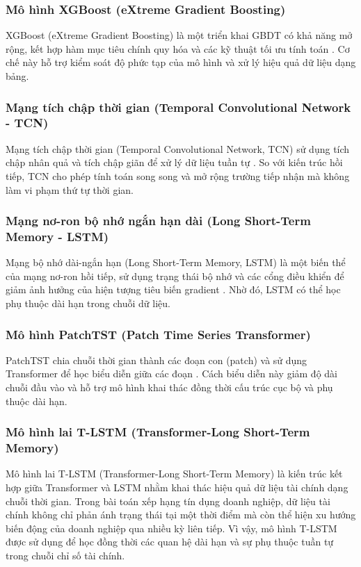 \documentclass[10pt,twoside]{article}
\begin{document}
\subsubsection{Mô hình XGBoost (eXtreme Gradient Boosting)}
XGBoost (eXtreme Gradient Boosting) là một triển khai GBDT có khả năng mở rộng, kết hợp hàm mục tiêu chính quy hóa và các kỹ thuật tối ưu tính toán \cite{chen_xgboost_2016}. Cơ chế này hỗ trợ kiểm soát độ phức tạp của mô hình và xử lý hiệu quả dữ liệu dạng bảng.
\subsubsection{Mạng tích chập thời gian (Temporal Convolutional Network - TCN)}
Mạng tích chập thời gian (Temporal Convolutional Network, TCN) sử dụng tích chập nhân quả và tích chập giãn để xử lý dữ liệu tuần tự \cite{bai_empirical_2018}. So với kiến trúc hồi tiếp, TCN cho phép tính toán song song và mở rộng trường tiếp nhận mà không làm vi phạm thứ tự thời gian.
\subsubsection{Mạng nơ-ron bộ nhớ ngắn hạn dài (Long Short-Term Memory - LSTM)}
Mạng bộ nhớ dài-ngắn hạn (Long Short-Term Memory, LSTM) là một biến thể của mạng nơ-ron hồi tiếp, sử dụng trạng thái bộ nhớ và các cổng điều khiển để giảm ảnh hưởng của hiện tượng tiêu biến gradient \cite{hochreiter_long_1997}. Nhờ đó, LSTM có thể học phụ thuộc dài hạn trong chuỗi dữ liệu.
\subsubsection{Mô hình PatchTST (Patch Time Series Transformer)}
PatchTST chia chuỗi thời gian thành các đoạn con (patch) và sử dụng Transformer để học biểu diễn giữa các đoạn \cite{nie_time_2023}. Cách biểu diễn này giảm độ dài chuỗi đầu vào và hỗ trợ mô hình khai thác đồng thời cấu trúc cục bộ và phụ thuộc dài hạn.
\subsubsection{Mô hình lai T-LSTM (Transformer-Long Short-Term Memory)}
Mô hình lai T-LSTM (Transformer-Long Short-Term Memory) \cite{kofune_enhancing_2026} là kiến trúc kết hợp giữa Transformer và LSTM nhằm khai thác hiệu quả dữ liệu tài chính dạng chuỗi thời gian. Trong bài toán xếp hạng tín dụng doanh nghiệp, dữ liệu tài chính không chỉ phản ánh trạng thái tại một thời điểm mà còn thể hiện xu hướng biến động của doanh nghiệp qua nhiều kỳ liên tiếp. Vì vậy, mô hình T-LSTM được sử dụng để học đồng thời các quan hệ dài hạn và sự phụ thuộc tuần tự trong chuỗi chỉ số tài chính.
\end{document}
